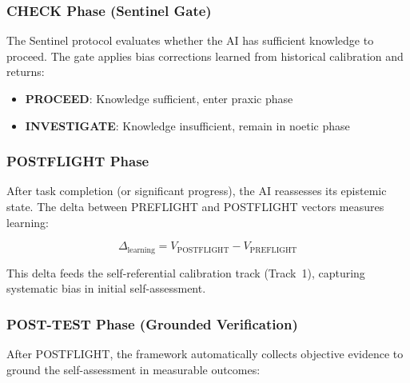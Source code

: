 \subsubsection{CHECK Phase (Sentinel Gate)}

The Sentinel protocol evaluates whether the AI has sufficient knowledge to proceed. The gate applies bias corrections learned from historical calibration and returns:
\begin{itemize}
    \item \textbf{PROCEED}: Knowledge sufficient, enter praxic phase
    \item \textbf{INVESTIGATE}: Knowledge insufficient, remain in noetic phase
\end{itemize}

\subsubsection{POSTFLIGHT Phase}

After task completion (or significant progress), the AI reassesses its epistemic state. The delta between PREFLIGHT and POSTFLIGHT vectors measures learning:

\begin{equation}
\Delta_{\text{learning}} = V_{\text{POSTFLIGHT}} - V_{\text{PREFLIGHT}}
\end{equation}

This delta feeds the self-referential calibration track (Track~1), capturing systematic bias in initial self-assessment.

\subsubsection{POST-TEST Phase (Grounded Verification)}

After POSTFLIGHT, the framework automatically collects objective evidence to ground the self-assessment in measurable outcomes:

